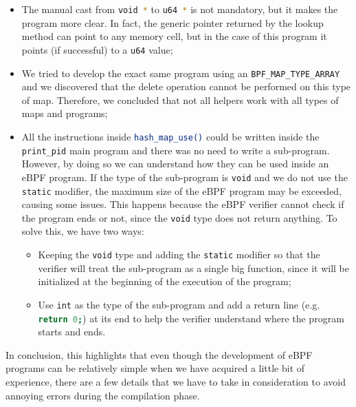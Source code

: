 \begin{itemize}
	\item 
		The manual cast from \colorbox{backcolour}{\lstinline[style=commandline, language=bash, breaklines=true]|void *|} to \colorbox{backcolour}{\lstinline[style=commandline, language=bash, breaklines=true]|u64 *|} is not mandatory, but it makes the program more clear.
		In fact, the generic pointer returned by the lookup method can point to any memory cell, but in the case of this program it points (if successful) to a \colorbox{backcolour}{\lstinline[style=commandline, language=bash, breaklines=true]|u64|} value;
	\item 
		We tried to develop the exact same program using an \colorbox{backcolour}{\lstinline[style=commandline, language=bash, breaklines=true]|BPF_MAP_TYPE_ARRAY|} and we discovered that the delete operation cannot be performed on this type of map.
		Therefore, we concluded that not all helpers work with all types of maps and programs;
	\item 
		All the instructions inside \colorbox{backcolour}{\lstinline[style=commandline, language=bash, breaklines=true]|hash_map_use()|} could be written inside the \colorbox{backcolour}{\lstinline[style=commandline, language=bash, breaklines=true]|print_pid|} main program and there was no need to write a sub-program.
		However, by doing so we can understand how they can be used inside an eBPF program.
		If the type of the sub-program is \colorbox{backcolour}{\lstinline[style=commandline, language=bash, breaklines=true]|void|} and we do not use the \colorbox{backcolour}{\lstinline[style=commandline, language=bash, breaklines=true]|static|} modifier, the maximum size of the eBPF program may be exceeded, causing some issues.
		This happens because the eBPF verifier cannot check if the program ends or not, since the \colorbox{backcolour}{\lstinline[style=commandline, language=bash, breaklines=true]|void|} type does not return anything.
		To solve this, we have two ways:
		\begin{itemize}
			\item 
				Keeping the \colorbox{backcolour}{\lstinline[style=commandline, language=bash, breaklines=true]|void|} type and adding the \colorbox{backcolour}{\lstinline[style=commandline, language=bash, breaklines=true]|static|} modifier so that the verifier will treat the sub-program as a single big function, since it will be initialized at the beginning of the execution of the program;
			\item 
				Use \colorbox{backcolour}{\lstinline[style=commandline, language=bash, breaklines=true]|int|} as the type of the sub-program and add a return line (e.g. \colorbox{backcolour}{\lstinline[style=commandline, language=bash, breaklines=true]|return 0;|}) at its end to help the verifier understand where the program starts and ends.
		\end{itemize}
\end{itemize}

In conclusion, this highlights that even though the development of eBPF programs can be relatively simple when we have acquired a little bit of experience, there are a few details that we have to take in consideration to avoid annoying errors during the compilation phase.